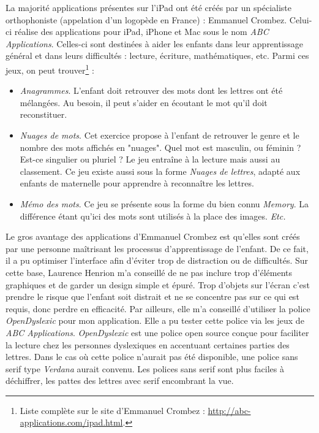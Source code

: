 La majorité applications présentes sur l'iPad ont été créés par un spécialiste orthophoniste (appelation d'un logopède en France) : Emmanuel Crombez. Celui-ci réalise des applications pour iPad, iPhone et Mac sous le nom \textit{ABC Applications}. Celles-ci sont destinées à aider les enfants dans leur apprentissage général et dans leurs difficultés : lecture, écriture, mathématiques, etc. Parmi ces jeux, on peut trouver\footnote{Liste complète sur le site d'Emmanuel Crombez : \url{http://abc-applications.com/ipad.html}.} :
\begin{itemize}
\item \textit{Anagrammes}. L'enfant doit retrouver des mots dont les lettres ont été mélangées. Au besoin, il peut s'aider en écoutant le mot qu'il doit reconstituer.
\item \textit{Nuages de mots}. Cet exercice propose à l'enfant de retrouver le genre et le nombre des mots affichés en "nuages". Quel mot est masculin, ou féminin ? Est-ce singulier ou pluriel ? Le jeu entraîne à la lecture mais aussi au classement. Ce jeu existe aussi sous la forme \textit{Nuages de lettres}, adapté aux enfants de maternelle pour apprendre à reconnaître les lettres.
\item \textit{Mémo des mots}. Ce jeu se présente sous la forme du bien connu \textit{Memory}. La différence étant qu'ici des mots sont utilisés à la place des images.
\textit{Etc.}\\

\end{itemize}
Le gros avantage des applications d'Emmanuel Crombez est qu'elles sont créés par une personne maîtrisant les processus d'apprentissage de l'enfant. De ce fait, il a pu optimiser l'interface afin d'éviter trop de distraction ou de difficultés. Sur cette base, Laurence Henrion m'a conseillé de ne pas inclure trop d'éléments graphiques et de garder un design simple et épuré. Trop d'objets sur l'écran c'est prendre le risque que l'enfant soit distrait et ne se concentre pas sur ce qui est requis, donc perdre en efficacité. Par ailleurs, elle m'a conseillé d'utiliser la police \textit{OpenDyslexic} pour mon application. Elle a pu tester cette police via les jeux de \textit{ABC Applications}. \textit{OpenDyslexic} est une police open source conçue pour faciliter la lecture chez les personnes dyslexiques en accentuant certaines parties des lettres. Dans le cas où cette police n'aurait pas été disponible, une police sans serif type \textit{Verdana} aurait convenu. Les polices sans serif sont plus faciles à déchiffrer, les pattes des lettres avec serif encombrant la vue.\\

